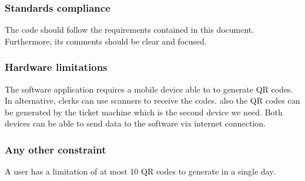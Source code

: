 \subsubsection{Standards compliance}
The code should follow the requirements contained in this document. Furthermore, its comments should
be clear and focused.
\subsubsection{Hardware limitations}
The software application requires a mobile device able to to generate QR codes. In
alternative, clerks can use scanners to receive the codes. also the QR codes can be generated by the ticket machine which is the second device we need.
Both devices can be able to send data to the software via internet connection.
\subsubsection{Any other constraint}
A user has a limitation of at most 10 QR codes to generate in a single day.